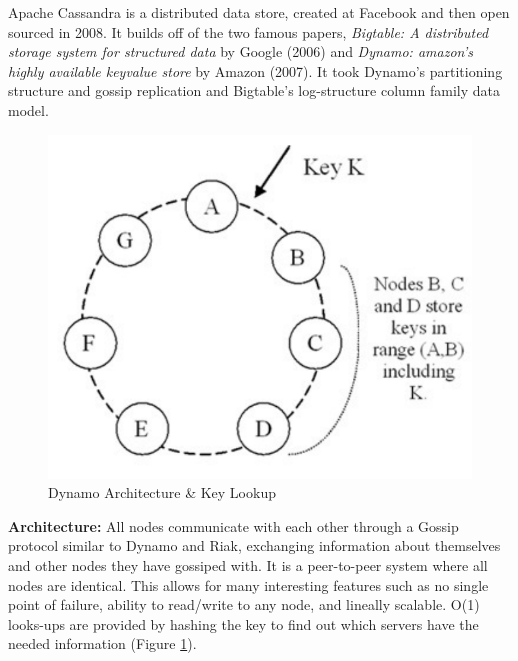 \documentclass[9pt]{extarticle} %
\begin{document}
%
%
\begin{minipage}[t]{.61\linewidth} %
\vspace{-0.4cm}
\hypertarget{firstnews}{} 

Apache Cassandra is a distributed data store, created at Facebook and then open sourced in 2008. It builds off of the two famous papers, \textit{Bigtable: A distributed storage system for structured data} by Google (2006) and \textit{Dynamo: amazon's highly available keyvalue store} by Amazon (2007). It took Dynamo's partitioning structure and gossip replication and Bigtable's log-structure column family data model.

\begin{figure}
\includegraphics[width=\linewidth]{imgs/dynamo.png} 
\caption{Dynamo Architecture \& Key Lookup}\label{fig:1}
\end{figure} 

\textbf{Architecture:} All nodes communicate with each other through a Gossip protocol similar to Dynamo and Riak, exchanging information about themselves and other nodes they have gossiped with. It is a peer-to-peer system where all nodes are identical. This allows for many interesting features such as no single point of failure, ability to read/write to any node, and lineally scalable. O(1) looks-ups are provided by hashing the key to find out which servers have the needed information (Figure \ref{fig:1}).


\end{minipage}
\end{document}
